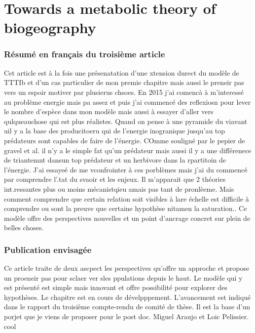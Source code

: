 \chapter{Towards a metabolic theory of biogeography}
\label{chap4}

\subsection{Résumé en français du troisième article}

Cet article est à la fois une présenatation d'une xtension durect du modèle de TTTIb et d'un cas particulier de mon premie chapitre mais aussi
le preneir pas vers un espoir motiver par plusierus chsoes. En 2015 j'ai comencà à m'interessé au problème energie mais pa assez et puis j'ai commencé
des reflexiosn pour lever le nombre d'espèce dans mon modèle mais aussi à essayer d'aller vers qulqueauchose qui est plus réalistes.
Quand on pense à une pyramide du viavant uil y a la base des producitoeru qui de l'energie inogranique jusqu'au top prédateurs sont capables de faire de l'énergie.
COmme souligné par le pepier de gravel et al. il n'y a le simple fat qu'un prédateur mais aussi il y a une différenece de triantemnt dansun top prédateur et un herbivore dans la rpartitoin de l'énergie. J'ai essayeé de me vconfrointer à ces porblèmes mais j'ai du commencé par comprendre l'.tat du svaoir et les enjeux. Il m'apparait que 2 théories int.ressantes plus ou moins mécanistqieu amais pas tant de pronlèeme. Mais comment comprendre que certain relation soit visibles à lare échelle est difficile à comprendre ou sont la preuve que certaine hypothèse nitamen la saturation..
Ce modèle offre des perspectives nouvelles et un point d'ancrage concret sur plein de belles choses.

\subsection{Publication envisagée}

Ce article traite de deux ascpect les perspectives qu'offre un approche et propose un proeneir pas pour sclaer ver sles ppulations depuis le haut.
Le modèle qui y est présenté est simple mais innovant et offre possibilité pour explorer des hypothèses.
Le chapitre est en cours de dévelpppement. L'avancement est indiqué dans le rapport du troisième compte-rendu de comité de thèse.
Il est la base d'un porjet que je viens de proposer pour le post doc.
Miguel Araujo et Loic Pelissier. cool

